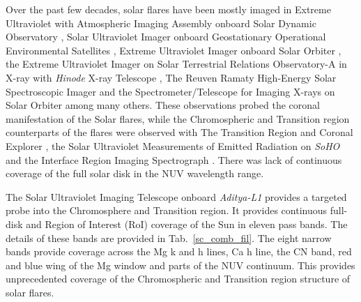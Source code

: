 \documentclass[lineno, pdflatex,sn-mathphys-ay]{sn-jnl}%
\begin{document}

Over the past few decades, solar flares have been mostly imaged in Extreme Ultraviolet with Atmospheric Imaging Assembly onboard Solar Dynamic Observatory \citep[{\it SDO}/AIA,][]{sdo,aia}, Solar Ultraviolet Imager onboard Geostationary Operational Environmental Satellites \citep[{\it GOES}/SUVI,][]{suvi}, Extreme Ultraviolet Imager onboard Solar Orbiter \citep[{\it SO}/EUI,][]{eui}, the Extreme Ultraviolet Imager on Solar Terrestrial Relations Observatory-A \citep[{\it STEREO-A}/EUVI,][]{euvi} in X-ray with {\it Hinode} X-ray Telescope \citep[{\it Hindoe}/XRT,][]{xrt}, The Reuven Ramaty High-Energy Solar Spectroscopic Imager \citep[{\it RHESSI}][]{rhessi} and the Spectrometer/Telescope for Imaging X-rays on Solar Orbiter \citep[{\it SO}/STIX,][]{stix} among many others. These observations probed the coronal manifestation of the Solar flares, while the Chromospheric and Transition region counterparts of the flares were observed with The Transition Region and Coronal Explorer \citep[{\it TRACE},][]{trace}, the Solar Ultraviolet Measurements of Emitted Radiation on {\it SoHO} \citep[{\it SoHO}/SUMER,][]{sumer} and the Interface Region Imaging Spectrograph \citep[{\it IRIS},][]{iris}. There was lack of continuous coverage of the full solar disk in the NUV wavelength range.

The Solar Ultraviolet Imaging Telescope onboard {\it Aditya-L1} \citep[{\it Aditya-L1}/SUIT,][]{article,ghosh16,adityal1,suit_main} provides a targeted probe into the Chromosphere and Transition region. It provides continuous full-disk and Region of Interest (RoI) coverage of the Sun in eleven pass bands. The details of these bands are provided in Tab.~\ref{sc_comb_fil}. The eight narrow bands provide coverage across the Mg  k and h lines, Ca  h line, the CN band, red and blue wing of the Mg  window and parts of the NUV continuum. This provides unprecedented coverage of the Chromospheric and Transition region structure of solar flares.
\end{document}
